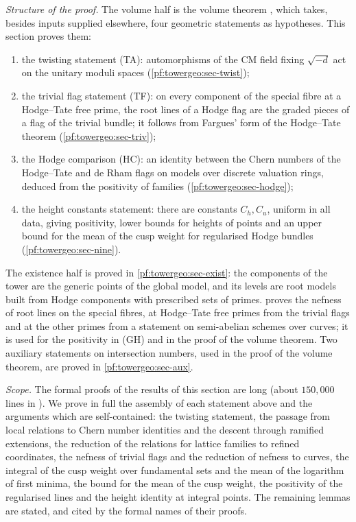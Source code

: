 \emph{Structure of the proof.} The volume half is the volume theorem
, which takes, besides inputs supplied elsewhere,
four geometric statements as hypotheses. This section proves them:
\begin{enumerate}[label=(\arabic*)]
\item the twisting statement (TA): automorphisms of the CM field fixing $\sqrt{-d}$ act on the unitary
  moduli spaces (\cref{pf:towergeo:sec-twist});
\item the trivial flag statement (TF): on every component of the special fibre at a Hodge--Tate free
  prime, the root lines of a Hodge flag are the graded pieces of a flag of the trivial bundle; it follows
  from Fargues' form of the Hodge--Tate theorem (\cref{pf:towergeo:sec-triv});
\item the Hodge comparison (HC): an identity between the Chern numbers of the Hodge--Tate and de Rham
  flags on models over discrete valuation rings, deduced from the positivity of families
  (\cref{pf:towergeo:sec-hodge});
\item the height constants statement: there are constants $C_h,C_u$, uniform in all data, giving
  positivity, lower bounds for heights of points and an upper bound for the mean of the cusp weight
  for regularised Hodge bundles (\cref{pf:towergeo:sec-nine}).
\end{enumerate}
The existence half is proved in \cref{pf:towergeo:sec-exist}: the components of the tower are the
generic points of the global model, and its levels are root models built from Hodge components with
prescribed sets of primes.  proves the nefness of root lines on the special fibres,
at Hodge--Tate free primes from the trivial flags and at the other primes from a statement on semi-abelian
schemes over curves; it is used for the positivity in (GH) and in the proof of the volume theorem. Two
auxiliary statements on intersection numbers, used in the proof of the volume theorem, are proved in
\cref{pf:towergeo:sec-aux}.

\emph{Scope.} The formal proofs of the results of this section are long (about $150{,}000$ lines in
\cite{LeanSource2026}). We prove in full the assembly of each statement above and the arguments which
are self-contained: the twisting statement, the passage from local relations to Chern number identities
and the descent through ramified extensions, the reduction of the relations for lattice families to refined
coordinates, the nefness of trivial flags and the reduction of nefness to curves, the integral of the cusp weight
over fundamental sets and the mean of the logarithm of first minima, the bound for the mean of the cusp weight,
the positivity of the regularised lines and the height identity at integral points. The remaining lemmas are
stated, and cited by the formal names of their proofs.

